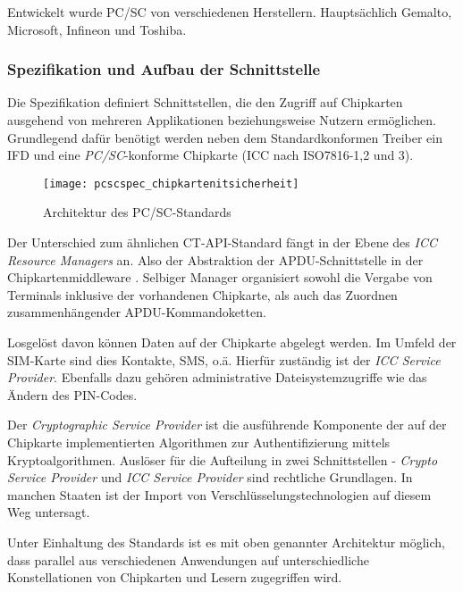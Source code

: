 Entwickelt wurde PC/SC von verschiedenen Herstellern. Hauptsächlich
Gemalto, Microsoft, Infineon und Toshiba.

\subsubsection{Spezifikation und Aufbau der Schnittstelle}
Die Spezifikation definiert Schnittstellen, die den Zugriff auf Chipkarten ausgehend
von mehreren Applikationen beziehungsweise Nutzern ermöglichen. Grundlegend
dafür benötigt werden neben dem Standardkonformen Treiber ein \ac{IFD} und
eine \textit{PC/SC}-konforme Chipkarte (\ac{ICC} nach ISO7816-1,2 und 3).

 \begin{figure}[htp]
  \begin{center}
   \texttt{[image: pcscspec\_chipkartenitsicherheit]}
  \end{center}
  \caption[Architektur des PC/SC-Standards]{Architektur des PC/SC-Standards \cite{spitz11}}
  \label{abb:architektur_pcsc}
 \end{figure}

Der Unterschied zum ähnlichen CT-API-Standard fängt in der Ebene
des \textit{ICC Resource Managers} an. Also der Abstraktion der
APDU-Schnittstelle in der Chipkartenmiddleware \cite{spitz11}.
Selbiger Manager organisiert sowohl die Vergabe von Terminals inklusive
der vorhandenen Chipkarte, als auch das Zuordnen zusammenhängender
APDU-Kommandoketten.

Losgelöst davon können Daten auf der Chipkarte abgelegt werden. Im Umfeld
der SIM-Karte sind dies Kontakte, SMS, o.ä. Hierfür zuständig ist der
\textit{ICC Service Provider}. Ebenfalls dazu gehören administrative Dateisystemzugriffe
wie das Ändern des PIN-Codes.

Der \textit{Cryptographic Service Provider} ist die ausführende Komponente
der auf der Chipkarte implementierten Algorithmen zur Authentifizierung mittels
Kryptoalgorithmen. Auslöser für die Aufteilung in zwei Schnittstellen -
\textit{Crypto Service Provider} und \textit{ICC Service Provider} sind
rechtliche Grundlagen. In manchen Staaten ist der Import von
Verschlüsselungstechnologien auf diesem Weg untersagt.

Unter Einhaltung des Standards ist es mit oben genannter Architektur möglich,
dass parallel aus verschiedenen Anwendungen auf unterschiedliche Konstellationen
von Chipkarten und Lesern zugegriffen wird.


